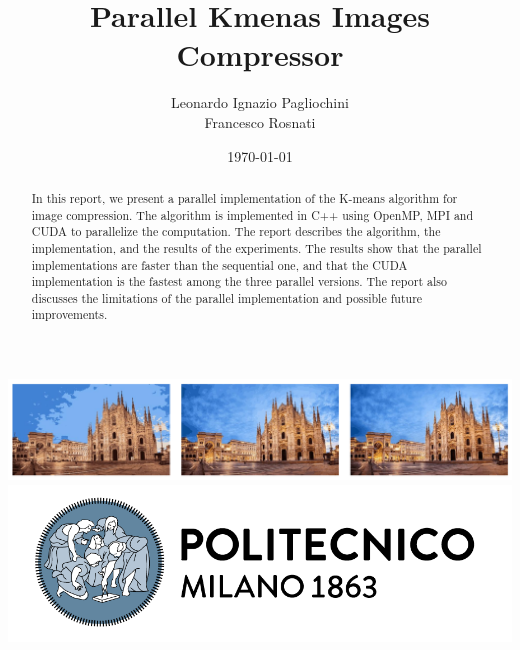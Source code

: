 \documentclass[12pt,oneside,a4paper]{article}
\title{\textbf{Parallel Kmenas Images Compressor}}
\author{Leonardo Ignazio Pagliochini \\ Francesco Rosnati}
\date{\today}
\begin{document}
\begin{titlepage}
	\centering
	\clearpage
	\maketitle
	\thispagestyle{empty}
	\vspace*{3cm}
	\includegraphics[width=14cm]{milanoCompressed.png} %
	\vfill
	\centering
	\includegraphics{logo_polimi.png}
\end{titlepage}


\begin{abstract}
In this report, we present a parallel implementation of the K-means algorithm for image compression. 
The algorithm is implemented in C++ using OpenMP, MPI and CUDA to parallelize the computation. 
The report describes the algorithm, the implementation, and the results of the experiments. 
The results show that the parallel implementations are faster than the sequential one, and that the CUDA implementation is the 
fastest among the three parallel versions. The report also discusses the limitations of the parallel implementation and possible future improvements.
\end{abstract}
\end{document}
